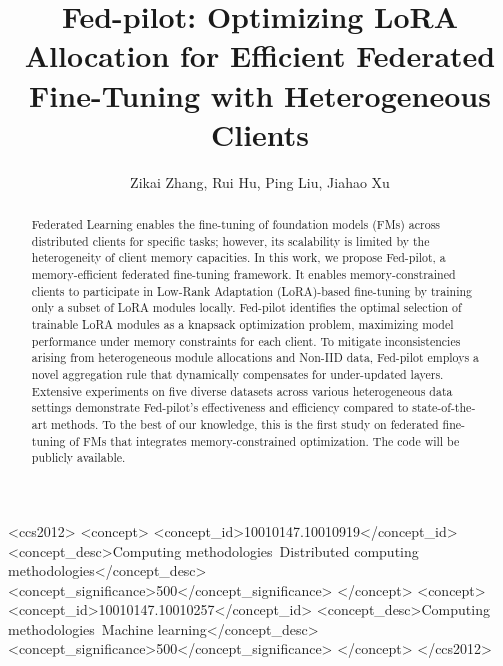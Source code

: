 \documentclass[sigconf]{acmart}
\begin{document}
\title{Fed-pilot: Optimizing LoRA Allocation for Efficient Federated Fine-Tuning with Heterogeneous Clients}

\author{Zikai Zhang, Rui Hu, Ping Liu, Jiahao Xu}

\renewcommand{\shortauthors}{Zhang et al.}

\begin{abstract}
Federated Learning enables the fine-tuning of foundation models (FMs) across distributed clients for specific tasks; however, its scalability is limited by the heterogeneity of client memory capacities. In this work, we propose Fed-pilot, a memory-efficient federated fine-tuning framework. It enables memory-constrained clients to participate in Low-Rank Adaptation (LoRA)-based fine-tuning by training only a subset of LoRA modules locally.
Fed-pilot identifies the optimal selection of trainable LoRA modules as a knapsack optimization problem, maximizing model performance under memory constraints for each client. To mitigate inconsistencies arising from heterogeneous module allocations and Non-IID data, Fed-pilot employs a novel aggregation rule that dynamically compensates for under-updated layers. Extensive experiments on five diverse datasets across various heterogeneous data settings demonstrate Fed-pilot's effectiveness and efficiency compared to state-of-the-art methods. To the best of our knowledge, this is the first study on federated fine-tuning of FMs that integrates memory-constrained optimization. The code will be publicly available.
\end{abstract}

\begin{CCSXML}
<ccs2012>
   <concept>
       <concept_id>10010147.10010919</concept_id>
       <concept_desc>Computing methodologies~Distributed computing methodologies</concept_desc>
       <concept_significance>500</concept_significance>
       </concept>
   <concept>
       <concept_id>10010147.10010257</concept_id>
       <concept_desc>Computing methodologies~Machine learning</concept_desc>
       <concept_significance>500</concept_significance>
       </concept>
 </ccs2012>
\end{CCSXML}
\end{document}
